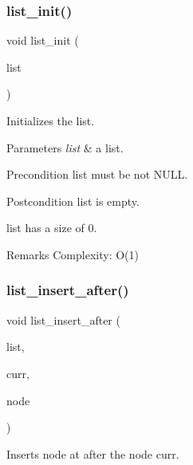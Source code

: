 \subsubsection{list\+\_\+init()}
{\footnotesize\ttfamily void list\+\_\+init (\begin{DoxyParamCaption}\item[{struct \textbf{ list} $\ast$}]{list }\end{DoxyParamCaption})\hspace{0.3cm}{\ttfamily [inline]}}

Initializes the list.


\begin{DoxyParams}{Parameters}
{\em list} & a list.\\
\hline
\end{DoxyParams}
\begin{DoxyPrecond}{Precondition}
{\ttfamily list} must be not N\+U\+LL.
\end{DoxyPrecond}
\begin{DoxyPostcond}{Postcondition}
{\ttfamily list} is empty. 

{\ttfamily list} has a size of 0.
\end{DoxyPostcond}
\begin{DoxyRemark}{Remarks}
Complexity\+: O(1) 
\end{DoxyRemark}
\mbox{\label{list_8c_aac5b9656592776dd99c192c7c8f2b18f}} 
\subsubsection{list\+\_\+insert\+\_\+after()}
{\footnotesize\ttfamily void list\+\_\+insert\+\_\+after (\begin{DoxyParamCaption}\item[{struct \textbf{ list} $\ast$}]{list,  }\item[{struct \textbf{ list\+\_\+node} $\ast$}]{curr,  }\item[{struct \textbf{ list\+\_\+node} $\ast$}]{node }\end{DoxyParamCaption})\hspace{0.3cm}{\ttfamily [inline]}}

Inserts {\ttfamily node} at after the node {\ttfamily curr}.


